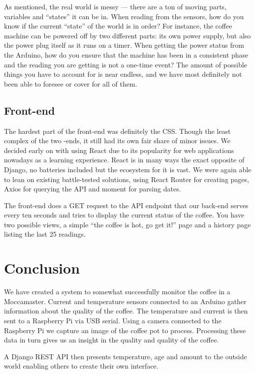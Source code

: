 \documentclass[12pt,a4paper,oneside,article]{memoir}
\numberwithin{equation}{chapter}
\begin{document}
As mentioned, the real world is messy --- there are a ton of moving parts,
variables and ``states'' it can be in. When reading from the sensors, how do you
know if the current ``state'' of the world is in order? For instance, the coffee
machine can be powered off by two different parts: its own power supply, but
also the power plug itself as it runs on a timer. When getting the power status
from the Arduino, how do you ensure that the machine has been in a consistent
phase and the reading you are getting is not a one-time event? The amount of
possible things you have to account for is near endless, and we have most
definitely not been able to foresee or cover for all of them.

\subsection{Front-end}\label{sec:front-end}
The hardest part of the front-end was definitely the CSS.  Though the least 
complex of the two -ends, it still had its own fair
share of minor issues. We decided early on with using React due to its
popularity for web applications nowadays as a learning experience. React is in
many ways the exact opposite of Django, no batteries included but the ecosystem
for it is vast. We were again able to lean on existing battle-tested solutions,
using React Router for creating pages, Axios for querying the API and moment for
parsing dates.

The front-end does a GET request to the API endpoint that our back-end serves
every ten seconds and tries to display the current status of the coffee. You
have two possible views, a simple ``the coffee is hot, go get it!'' page and a
history page listing the last 25 readings.

\section{Conclusion}\label{sec:conclusion}
We have created a system to somewhat successfully monitor the coffee in a 
Moccamaster. %
Current and temperature sensors connected to an Arduino gather information about 
the quality of the coffee. The temperature and current is then sent to a 
Raspberry Pi via USB serial. Using a camera connected to the Raspberry Pi we 
capture an image of the coffee pot to process. Processing these data in 
turn gives us an insight in the quality and quality of the coffee.

A Django REST API then presents temperature, age and amount to the outside 
world enabling others to create their own interface. 
\end{document}
